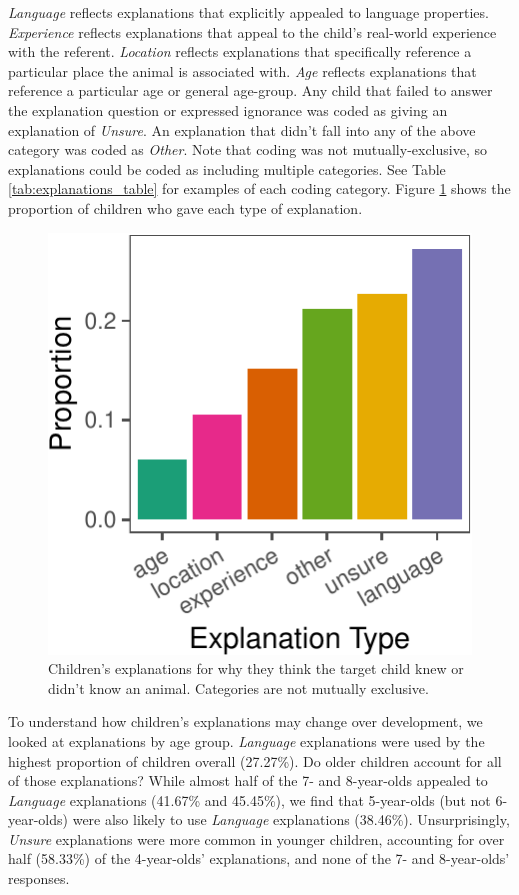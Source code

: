 \documentclass[10pt, letterpaper]{article}
\newenvironment{CodeChunk}{}{}
\begin{document}
\emph{Language} reflects explanations that explicitly appealed to
language properties. \emph{Experience} reflects explanations that appeal
to the child's real-world experience with the referent. \emph{Location}
reflects explanations that specifically reference a particular place the
animal is associated with. \emph{Age} reflects explanations that
reference a particular age or general age-group. Any child that failed
to answer the explanation question or expressed ignorance was coded as
giving an explanation of \emph{Unsure}. An explanation that didn't fall
into any of the above category was coded as \emph{Other}. Note that
coding was not mutually-exclusive, so explanations could be coded as
including multiple categories. See Table \ref{tab:explanations_table}
for examples of each coding category. Figure \ref{fig:explanations}
shows the proportion of children who gave each type of explanation.

\begin{CodeChunk}
\begin{figure}[tb]
\includegraphics{figs/explanations-1} \caption[Children's explanations for why they think the target child knew or didn't know an animal]{Children's explanations for why they think the target child knew or didn't know an animal. Categories are not mutually exclusive.}\label{fig:explanations}
\end{figure}
\end{CodeChunk}

To understand how children's explanations may change over development,
we looked at explanations by age group. \emph{Language} explanations
were used by the highest proportion of children overall (27.27\%). Do
older children account for all of those explanations? While almost half
of the 7- and 8-year-olds appealed to \emph{Language} explanations
(41.67\% and 45.45\%), we find that 5-year-olds (but not 6-year-olds)
were also likely to use \emph{Language} explanations (38.46\%).
Unsurprisingly, \emph{Unsure} explanations were more common in younger
children, accounting for over half (58.33\%) of the 4-year-olds'
explanations, and none of the 7- and 8-year-olds' responses.
\end{document}
